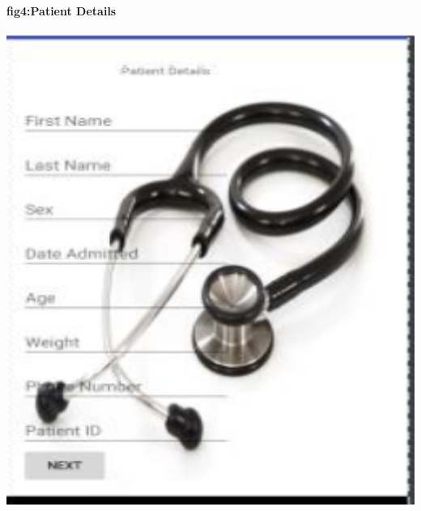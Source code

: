 \documentclass[12pt,]{article}
\begin{document}
\paragraph{fig4:Patient Details}
\includegraphics[width=1.0\textwidth]{./capture4}\\[0.1in]
\end{document}
